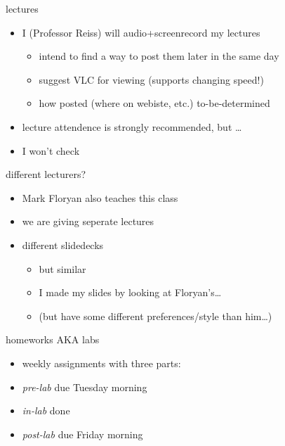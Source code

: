 \begin{frame}{lectures}
    \begin{itemize}
    \item I (Professor Reiss) will audio+screenrecord my lectures
        \begin{itemize}
        \item intend to find a way to post them later in the same day
        \item suggest VLC for viewing (supports changing speed!)
        \item how posted (where on webiste, etc.) to-be-determined
        \end{itemize}
    \item lecture attendence is strongly recommended, but \ldots
    \item I won't check
    \end{itemize}
\end{frame}

\begin{frame}{different lecturers?}
    \begin{itemize}
    \item Mark Floryan also teaches this class
    \item we are giving seperate lectures
    \item different slidedecks
        \begin{itemize}
        \item but similar
        \item I made my slides by looking at Floryan's\ldots
        \item (but have some different preferences/style than him\ldots)
        \end{itemize}
    \end{itemize}
\end{frame}

\begin{frame}{homeworks AKA labs}
    \begin{itemize}
    \item weekly assignments with three parts:
    \vspace{.5cm}
    \item \textit{pre-lab} due Tuesday morning
    \item \textit{in-lab} done 
    \item \textit{post-lab} due Friday morning
    \end{itemize}
\end{frame}


